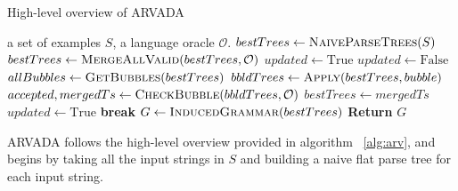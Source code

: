 \begin{algorithm}[H]
\caption{High-level overview of ARVADA \cite{kulkarniLearningHighlyRecursive2021}}\label{alg:arv}
\begin{algorithmic}[1]
    \Require a set of examples $S$, a language oracle $\mathcal{O}$.
    \State $bestTrees \gets \textsc{NaiveParseTrees}(S)$
    \State $bestTrees \gets \textsc{MergeAllValid}(bestTrees, \mathcal{O})$
    \State $updated \gets \text{True}$
        \State $updated \gets \text{False}$
        \State $allBubbles \gets \textsc{GetBubbles}(bestTrees)$
            \State $bbldTrees \gets \textsc{Apply}(bestTrees, bubble)$
            \State $accepted, mergedTs \gets \textsc{CheckBubble}(bbldTrees, \mathcal{O})$
                \State $bestTrees \gets mergedTs$
                \State $updated \gets \text{True}$
                \State \textbf{break}
            \EndIf
        \EndFor
    \EndWhile
    \State $G \gets \textsc{InducedGrammar}(bestTrees)$
    \State \textbf{Return} $G$
\end{algorithmic}
\end{algorithm}

ARVADA follows the high-level overview provided in algorithm ~\ref{alg:arv}, and begins by taking all the input strings in $S$ and building a naive flat parse tree for each input string.


